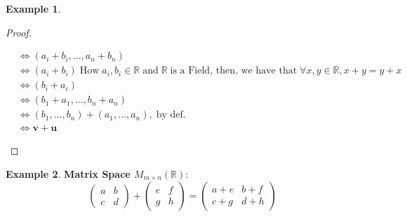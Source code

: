 \documentclass{article}
\theoremstyle{plain}
\theoremstyle{definition}
\newtheorem{example}{Example}[section]
\theoremstyle{remark}
\newcommand{\thmheader}[1]{%
  \textcolor{#1}{\normalfont\bfseries}%
}
\begin{document}
\begin{example}
\begin{proof}
\begin{enumerate}[label=(V\arabic*),leftmargin=*]
\[\begin{aligned}
                                            &\Leftrightarrow (a_i + b_i, \ldots, a_n + b_n) \\
                                            &\Leftrightarrow (a_i + b_i) \;\text{How}\; a_i, b_i \in \mathbb{R} \;\text{and}\; \mathbb{R} \;\text{is a Field, then, we have that}\; \forall x, y \in \mathbb{R}, x + y = y + x \\
                                            &\Leftrightarrow (b_i + a_i) \\
                                            &\Leftrightarrow (b_1 + a_1, \ldots, b_n + a_n) \\
                                            &\Leftrightarrow (b_1, \ldots, b_n) + (a_1, \ldots, a_n), \;\text{by def.}\; \\
                                            &\Leftrightarrow \mathbf{v} + \mathbf{u}
                \end{aligned}
                \]
        \end{enumerate}
    \end{proof}
\end{example}

\begin{example}
\thmheader{excolor}\textbf{Matrix Space $M_{m \times n}(\mathbb{R})$}:
\[
\begin{pmatrix} a & b \\ c & d \end{pmatrix} + \begin{pmatrix} e & f \\ g & h \end{pmatrix} = \begin{pmatrix} a+e & b+f \\ c+g & d+h \end{pmatrix}
\]
\end{example}
\end{document}

